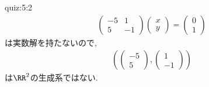 \begin{answerof}{quiz:5:2}
\begin{align*}
\begin{pmatrix}
      -5&1\\5&-1
    \end{pmatrix}
    \begin{pmatrix}
      x\\y
    \end{pmatrix}=
    \begin{pmatrix}0\\1\end{pmatrix}
  \end{align*}
  は実数解を持たないので,
  \begin{align*}
    (\begin{pmatrix}-5\\5\end{pmatrix},\begin{pmatrix}1\\-1\end{pmatrix})
  \end{align*}
  は$\RR^2$の生成系ではない.
\end{answerof}

